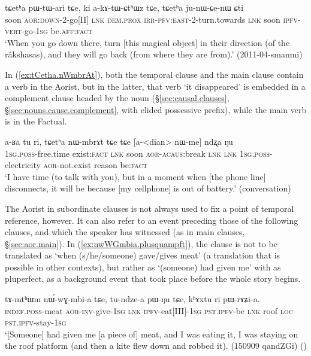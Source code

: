 \begin{exe}
\ex \label{ex:pWtari.nWtCu}
 \gll tɕetʰa pɯ-tɯ-ari tɕe, ki a-kɤ-tɯ-ɕtʰɯz tɕe, tɕetʰa ju-nɯ-ɕe-nɯ ɕti \\
 soon \textsc{aor}:\textsc{down}-2-go[II] \textsc{lnk} \textsc{dem}.\textsc{prox} \textsc{irr}-\textsc{pfv}:\textsc{east}-2-turn.towards \textsc{lnk} soon \textsc{ipfv}-\textsc{vert}-go-\textsc{1sg} be.\textsc{aff}:\textsc{fact} \\
 \glt `When you go down there, turn [this magical object] in their direction (of the râkshasas), and they will go back (from where they are from).' (2011-04-smanmi)
\end{exe}


In (\ref{ex:tCetha.nWmbrAt}), both the temporal clause and the main clause contain a verb in the Aorist, but in the latter, that verb  `it disappeared' is embedded in a complement clause headed by the noun  (§\ref{sec:causal.clauses}, §\ref{sec:nouns.cause.complement}, with elided possessive prefix), while the main verb  is in the Factual.

\begin{exe}
\ex \label{ex:tCetha.nWmbrAt}
 \gll a-ʁa tu ri, tɕetʰa nɯ-mbrɤt tɕe tɕe [a-<dian> nɯ-me] ndʐa ŋu \\
 \textsc{1sg}.\textsc{poss}-free.time exist:\textsc{fact} \textsc{lnk} soon \textsc{aor}-\textsc{acaus}:break \textsc{lnk} \textsc{lnk} \textsc{1sg}.\textsc{poss}-electricity \textsc{aor}-not.exist reason be:\textsc{fact} \\
\glt `I have time (to talk with you), but in a moment when [the phone line] disconnects, it will be because [my cellphone] is out of battery.' (conversation)
\end{exe}

The Aorist in subordinate clauses is not always used to fix a point of temporal reference, however. It can also refer to an event preceding those of the following clauses, and which the speaker has witnessed (as in main clauses, §\ref{sec:aor.main}). In (\ref{ex:nwWGmbia.plusquampft}), the clause  is not to be translated as `when (s/he/someone) gave/gives meat' (a translation that is possible in other contexts), but rather as `(someone) had given me' with as pluperfect, as a background event that took place before the whole story begins.

\begin{exe}
\ex \label{ex:nwWGmbia.plusquampft}
 \gll tɤ-mtʰɯm nɯ́-wɣ-mbi-a tɕe, tu-ndze-a pɯ-ŋu tɕe, kʰɤxtu ri pɯ-rɤʑi-a. \\
 \textsc{indef}.\textsc{poss}-meat \textsc{aor}-\textsc{inv}-give-\textsc{1sg} \textsc{lnk} \textsc{ipfv}-eat[III]-\textsc{1sg} \textsc{pst}.\textsc{ipfv}-be \textsc{lnk} roof \textsc{loc} \textsc{pst}.\textsc{ipfv}-stay-\textsc{1sg} \\
 \glt `[Someone] had given me [a piece of] meat, and I was eating it, I was staying on the roof platform (and then a kite flew down and robbed it). (150909 qandZGi)
()
\end{exe} 
 
